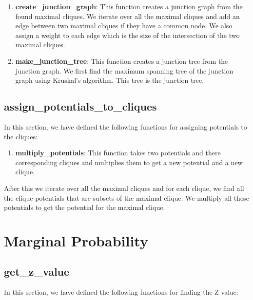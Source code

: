 \documentclass[12pt]{article}
\begin{document}
\begin{enumerate}
    \item \textbf{create\_junction\_graph}: This function creates a junction graph from the found maximal cliques. We iterate over all the maximal cliques and add an edge between two maximal cliques if they have a common node. We also assign a weight to each edge which is the size of the intersection of the two maximal cliques.
    
    \item \textbf{make\_junction\_tree}: This function creates a junction tree from the junction graph. We first find the maximum spanning tree of the junction graph using Kruskal's algorithm. This tree is the junction tree.
\end{enumerate}

\subsection{assign\_potentials\_to\_cliques}

In this section, we have defined the following functions for assigning potentials to the cliques:

\begin{enumerate}
    \item \textbf{multiply\_potentials}: This function takes two potentials and there corresponding cliques and multiplies them to get a new potential and a new clique.
\end{enumerate}

After this we iterate over all the maximal cliques and for each clique, we find all the clique potentials that are subsets of the maximal clique. We multiply all these potentials to get the potential for the maximal clique.

\section{Marginal Probability}

\subsection{get\_z\_value}
In this section, we have defined the following functions for finding the Z value:
\end{document}

